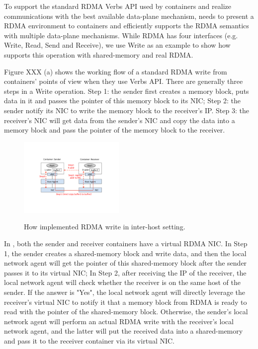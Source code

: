 To support the standard RDMA Verbs API used by containers and realize
communications with the best available data-plane mechanism, \sysname needs
to present a RDMA environment to containers and efficiently supports 
the RDMA semantics with multiple data-plane mechanisms. 
While RDMA has four interfaces (e.g. Write, Read, Send and Receive), we use Write as an example
to show how \sysname supports this operation with shared-memory and real RDMA.



Figure XXX (a) shows the working flow of a standard RDMA write from containers'
points of view when they use Verbs API. There are generally three steps in a 
Write operation. 
Step 1: the sender first creates a memory block, puts data in it and passes 
the pointer of this memory block to its NIC;
Step 2: the sender notify its NIC to write the memory block to the receiver's IP.
Step 3: the receiver's NIC will get data from the sender's NIC and copy the 
data into a memory block and pass the pointer of the memory block to the 
receiver.

     \begin{figure}[ht]
     \centering 
     \includegraphics[width=0.45\textwidth]{figures/system/sys_rdma_rdma.pdf}      
     \label{fig:sys_rdma_rdma}
     \caption{How \sysname implemented RDMA write in inter-host setting.} 
     \end{figure}

In \sysname, both the sender and receiver containers have a virtual RDMA NIC.
In Step 1, the sender creates a shared-memory block and write data, and then 
the local network agent will get the pointer of this shared-memory block after the sender passes it to its virtual NIC; In Step 2, after receiving the IP of 
the receiver, the local network agent will check whether the receiver is on
the same host of the sender. If the answer is "Yes", the local network agent will
directly leverage the receiver's virtual NIC to notify it that a memory block 
from RDMA is ready to read with the pointer of the shared-memory block. 
Otherwise, the sender's local network agent will perform an actual RDMA write
with the receiver's local network agent, and the latter will put the received data into a shared-memory and pass it to the receiver container via its virtual NIC.
     
